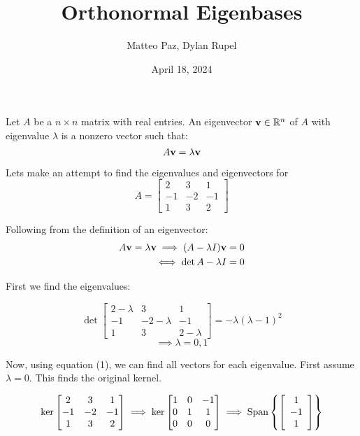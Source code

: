 \documentclass{article}
\author{Matteo Paz, Dylan Rupel}
\date{April 18, 2024}
\title{Orthonormal Eigenbases}
\begin{document}
    \maketitle{}
    \noindent

    \begin{definition}
        Let $A$ be a $n \times n$ matrix with real entries. An eigenvector $\mathbf{v} \in \mathbb{R}^n$ of $A$ with eigenvalue $\lambda$ is a nonzero vector such that:
        \[A\mathbf{v} = \lambda \mathbf{v}\]
    \end{definition}

    Lets make an attempt to find the eigenvalues and eigenvectors for
    \[A = \begin{bmatrix}
        2 & 3 & 1 \\
        -1 & -2 & -1 \\
        1 & 3 & 2
    \end{bmatrix}\]

    Following from the definition of an eigenvector:
    \begin{align}
    A\mathbf{v} = \lambda \mathbf{v} \implies (A - \lambda I)\mathbf{v} = 0 \\
    \iff \det{A - \lambda I} = 0
    \end{align}

    First we find the eigenvalues:

    \[\det{\begin{bmatrix}
        2 - \lambda & 3 & 1 \\
        -1 & -2-\lambda & -1 \\
        1 & 3 & 2 - \lambda
    \end{bmatrix}} = -\lambda(\lambda - 1)^2
    \]
    \[\implies \lambda = 0,1\]

    Now, using equation (1), we can find all vectors for each eigenvalue. First assume $\lambda = 0$. This finds the original kernel.

    \[\ker \begin{bmatrix}
       2 & 3 & 1 \\ 
       -1 & -2 & -1 \\
       1 & 3 & 2 
    \end{bmatrix} \implies \ker \begin{bmatrix}
        1 & 0 & -1 \\
        0 & 1 & 1 \\
        0 & 0 & 0
    \end{bmatrix} \implies \operatorname{Span}\left\{\left[\begin{array}{c}1 \\ -1 \\ 1\end{array}\right]\right\}\]
\end{document}
